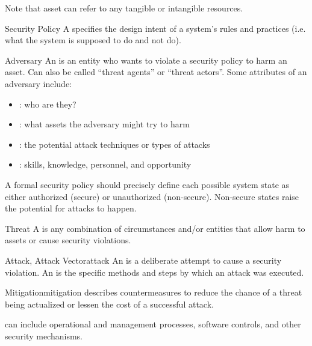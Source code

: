 \documentclass[code]{amznotes}
\begin{document}
Note that asset can refer to any tangible or intangible resources.

\begin{dfnbox}{Security Policy}{}
    A  specifies the design intent of a system's rules and practices (i.e. what the system is supposed to do and not do).
\end{dfnbox}

\begin{dfnbox}{Adversary}{}
    An  is an entity who wants to violate a security policy to harm an asset. Can also be called ``threat agents'' or ``threat actors''. Some attributes of an adversary include:
    \begin{itemize}[noitemsep]
        \item {}: who are they?
        \item {}: what assets the adversary might try to harm
        \item {}: the potential attack techniques or types of attacks
        \item {}: skills, knowledge, personnel, and opportunity
    \end{itemize}
\end{dfnbox}

A formal security policy should precisely define each possible system state as either authorized (secure) or unauthorized (non-secure). Non-secure states raise the potential for attacks to happen.

\begin{dfnbox}{Threat}{}
    A  is any combination of circumstances and/or entities that allow harm to assets or cause security violations.
\end{dfnbox}

\begin{dfnbox}{Attack, Attack Vector}{attack}
    An  is a deliberate attempt to cause a security violation. An  is the specific methods and steps by which an attack was executed.

\end{dfnbox}

\begin{dfnbox}{Mitigation}{mitigation}
     describes countermeasures to reduce the chance of a threat being actualized or lessen the cost of a successful attack.
\end{dfnbox}

 can include operational and management processes, software controls, and other security mechanisms.
\end{document}
